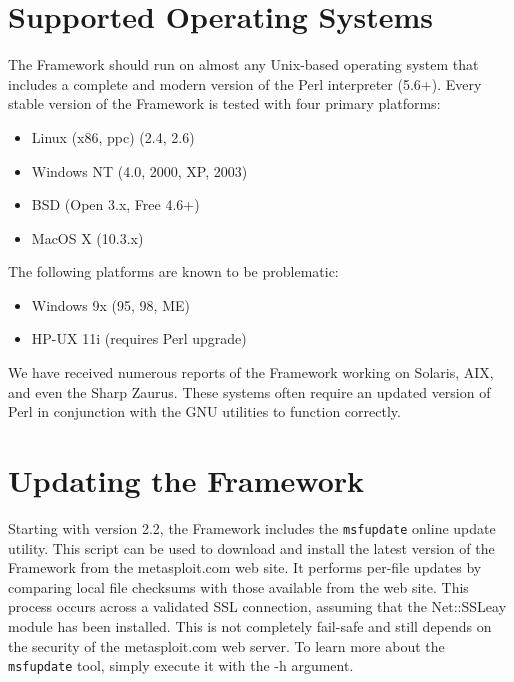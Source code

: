 \documentclass{report}
\begin{document}
    \section{Supported Operating Systems}
    \label{INSTALL-SUPPORT}
\par
The Framework should run on almost any Unix-based operating system that includes
a complete and modern version of the Perl interpreter (5.6+). Every stable
version of the Framework is tested with four primary platforms: 

\begin{itemize}
\item Linux (x86, ppc) (2.4, 2.6)
\item Windows NT (4.0, 2000, XP, 2003)
\item BSD (Open 3.x, Free 4.6+)
\item MacOS X (10.3.x)
\end{itemize}

\par
The following platforms are known to be problematic:
\begin{itemize}
\item Windows 9x (95, 98, ME)
\item HP-UX 11i (requires Perl upgrade)
\end{itemize}

\par
We have received numerous reports of the Framework working on Solaris,
AIX, and even the Sharp Zaurus. These systems often require an
updated version of Perl in conjunction with the GNU utilities to function
correctly.


    \section{Updating the Framework}
    \label{INSTALL-UPDATE}
\par
Starting with version 2.2, the Framework includes the \texttt{msfupdate} online update
utility. This script can be used to download and install the latest version of
the Framework from the metasploit.com web site. It performs per-file updates by
comparing local file checksums with those available from the web site. This
process occurs across a validated SSL connection, assuming that the Net::SSLeay
module has been installed. This is not completely fail-safe and still depends on
the security of the metasploit.com web server. To learn more about the
\texttt{msfupdate} tool, simply execute it with the -h argument. 
\end{document}
